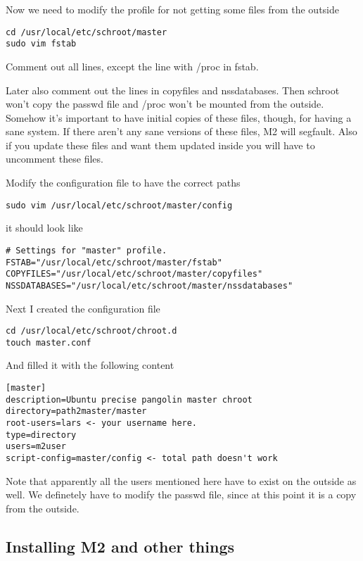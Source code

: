 \documentclass[a4paper]{book}
\begin{document}
Now we need to modify the profile for not getting some files from the outside

\begin{verbatim}
cd /usr/local/etc/schroot/master
sudo vim fstab
\end{verbatim}

Comment out all lines, except the line with /proc in fstab. 

Later also comment out the lines in copyfiles and nssdatabases.  Then schroot
won't copy the passwd file and /proc won't be mounted from the outside.
Somehow it's important to have initial copies of these files, though, for
having a sane system. If there aren't any sane versions of these files, M2 will
segfault.  Also if you update these files and want them updated inside you will
have to uncomment these files.

Modify the configuration file to have the correct paths

\begin{verbatim}
sudo vim /usr/local/etc/schroot/master/config
\end{verbatim}

it should look like

\begin{verbatim}
# Settings for "master" profile.
FSTAB="/usr/local/etc/schroot/master/fstab"
COPYFILES="/usr/local/etc/schroot/master/copyfiles"
NSSDATABASES="/usr/local/etc/schroot/master/nssdatabases"
\end{verbatim}

Next I created the configuration file

\begin{verbatim}
cd /usr/local/etc/schroot/chroot.d
touch master.conf
\end{verbatim}

And filled it with the following content

\begin{verbatim}
[master]
description=Ubuntu precise pangolin master chroot
directory=path2master/master
root-users=lars <- your username here.
type=directory
users=m2user
script-config=master/config <- total path doesn't work
\end{verbatim}

Note that apparently all the users mentioned here have to exist on the outside
as well.  We definetely have to modify the passwd file, since at this point it
is a copy from the outside.

\subsection{Installing M2 and other things}
\end{document}
